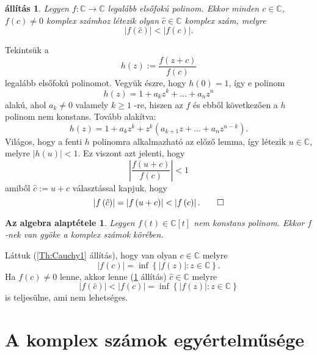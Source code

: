 \documentclass[9pt, showtrims]{memoir}
\makeatletter
\renewenvironment{proof}[1][\proofname]
    {\par\pushQED{\qed}%
    \normalfont \topsep6\p@\@plus6\p@\relax
    \trivlist
    \item[\hskip\labelsep
        \itshape
    #1\@addpunct{:}]\ignorespaces}
    {\popQED\endtrivlist\@endpefalse}
\theoremstyle{plain}
\newtheorem{proposition}{állítás}[section]
\newtheorem*{FA}{Az algebra alaptétele}
\theoremstyle{remark}
\theoremstyle{definition}
\makeatother
\begin{document}
\begin{proposition}
\label{Th:Cauchy2}Legyen $f:\mathbb{C}\rightarrow \mathbb{C}$ legalább elsőfokú polinom.
Ekkor minden $c\in \mathbb{C}$, $f\left( c\right) \neq 0$
komplex számhoz létezik olyan $\hat{c}\in \mathbb{C}$ komplex szám,
melyre 
\[
\left| f\left( \hat{c}\right) \right| <\left| f\left( c\right) \right| .
\]
\end{proposition}

\begin{proof}
Tekintsük a 
\[
h\left( z\right) :=\frac{f\left( z+c\right) }{f\left( c\right) }
\]
legalább elsőfokú polinomot.
Vegyük észre, hogy $h\left(
0\right) =1$, így e polinom 
\[
h\left( z\right) =1+a_{k}z^{k}+\ldots +a_{n}z^{n}
\]
alakú, ahol $a_{k}\neq 0$ valamely $k\geq 1$ -re, hiszen az $f$ és
ebből következően a $h$ polinom nem konstans.
Tovább alakítva: 
\[
h\left( z\right) =1+a_{k}z^{k}+z^{k}\left( a_{k+1}z+\ldots
+a_{n}z^{n-k}\right) .
\]
Világos, hogy a fenti $h$ polinomra alkalmazható az előző
lemma, így létezik $u\in \mathbb{C}$, melyre $\left| h\left( u\right)
\right| <1.$ Ez viszont azt jelenti, hogy 
\[
\left| \frac{f\left( u+c\right) }{f\left( c\right) }\right| <1
\]
amiből $\hat{c}:=u+c$ választással kapjuk, hogy 
\[
\left| f\left( \hat{c}\right) \right| =\left| f\left( u+c\right) \right|
<\left| f\left( c\right) \right| .\qedhere
\]
\end{proof}

\begin{FA}\label{Th:FundOfAlg}
    Legyen $f\left( t \right)\in\mathbb{C}[t]$ nem konstans polinom.
    Ekkor $f$-nek van gyöke a komplex számok körében.
\end{FA}

\begin{proof}
Láttuk (\ref{Th:Cauchy1} állítás), hogy van olyan $c\in \mathbb{C}$ melyre 
\[
\left| f\left( c\right) \right| =\inf \left\{ \left| f\left( z\right)
\right| :z\in \mathbb{C}\right\} \text{.}
\]
Ha $f(c)\neq 0$ lenne, akkor lenne (\ref{Th:Cauchy2} állítás) $\hat{c}\in \mathbb{C}$ melyre 
\[
\left| f\left( \hat{c}\right) \right| <\left| f\left( c\right) \right| =\inf
\left\{ \left| f\left( z\right) \right| :z\in \mathbb{C}\right\} 
\]
is teljesülne, ami nem lehetséges.
\end{proof}

\section{A komplex számok egyértelműsége}
\end{document}

